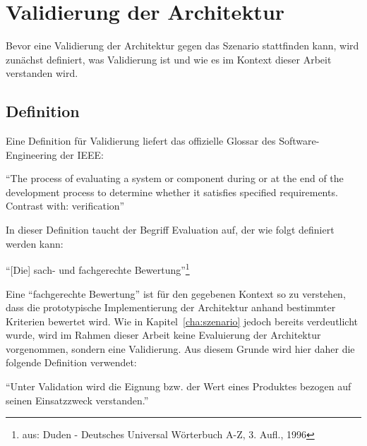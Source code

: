 
\chapter{Validierung der Architektur} %
\label{cha:validierung_der_architektur}

  Bevor eine Validierung der Architektur gegen das Szenario stattfinden kann, wird zunächst definiert, was Validierung ist und wie es im Kontext dieser Arbeit verstanden wird.
  
\section{Definition} %
\label{sec:definition_validierung}
  
  Eine Definition für Validierung liefert das offizielle Glossar des Software-Engineering der IEEE:

  \begin{definition}\label{def:validierung_ieee}
    "`The process of evaluating a system or component during or at the end of the development process to determine whether it satisfies specified requirements. Contrast with: verification"'~\emph{\citep{ieee90sg}}
  \end{definition}
  
  In dieser Definition taucht der Begriff Evaluation auf, der wie folgt definiert werden kann:
  
  \begin{definition}[Evaluation]\label{def:evaluation}
    "`[Die] sach- und fachgerechte Bewertung"'\footnote{aus: Duden - Deutsches Universal Wörterbuch A-Z, 3. Aufl., 1996}
  \end{definition}
  
  Eine "`fachgerechte Bewertung"' ist für den gegebenen Kontext so zu verstehen, dass die prototypische Implementierung der Architektur anhand bestimmter Kriterien bewertet wird. Wie in Kapitel~\ref{cha:szenario} jedoch bereits verdeutlicht wurde, wird im Rahmen dieser Arbeit keine Evaluierung der Architektur vorgenommen, sondern eine Validierung. Aus diesem Grunde wird hier daher die folgende Definition verwendet:
  
  \begin{definition}\label{def:validierung_balzert}
    "`Unter Validation wird die Eignung bzw. der Wert eines Produktes bezogen auf seinen Einsatzzweck verstanden."'~\emph{\citep[S. 101]{balzert1998lst}}
  \end{definition}
  
